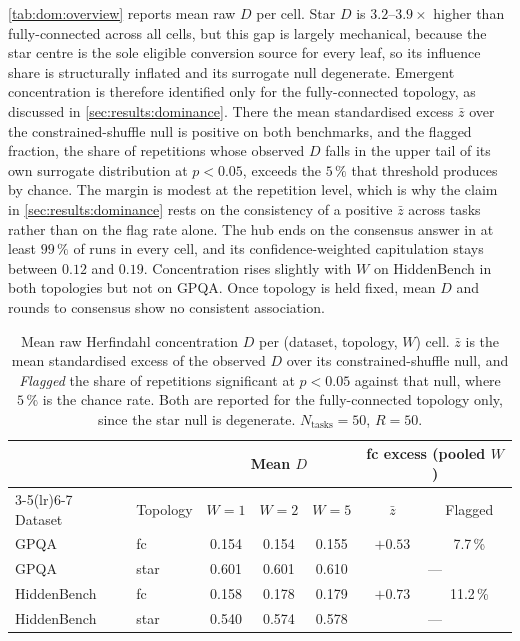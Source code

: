 \autoref{tab:dom:overview} reports mean raw $D$ per cell. Star $D$ is
$3.2$--$3.9\times$ higher than fully-connected across all cells, but this gap is
largely mechanical, because the star centre is the sole eligible conversion source for
every leaf, so its influence share is structurally inflated and its surrogate null
degenerate. Emergent concentration is therefore identified only for the
fully-connected topology, as discussed in \autoref{sec:results:dominance}. There
the mean standardised excess $\bar z$ over the constrained-shuffle null is positive
on both benchmarks, and the flagged fraction, the share of repetitions whose
observed $D$ falls in the upper tail of its own surrogate distribution at
$p < 0.05$, exceeds the $5\,\%$ that threshold produces by chance. The margin is
modest at the repetition level, which is why the claim in
\autoref{sec:results:dominance} rests on the consistency of a positive $\bar z$
across tasks rather than on the flag rate alone. The hub ends on the consensus
answer in at least $99\,\%$ of runs in every cell, and its confidence-weighted
capitulation stays between $0.12$ and $0.19$. Concentration rises slightly with $W$
on HiddenBench in both topologies but not on GPQA. Once topology is held fixed,
mean $D$ and rounds to consensus show no consistent association.

\begin{table}[H]
\centering
\small
\begin{tabular}{llccccc}
\toprule
 & & \multicolumn{3}{c}{Mean $D$} & \multicolumn{2}{c}{fc excess (pooled $W$)} \\
\cmidrule(lr){3-5}\cmidrule(lr){6-7}
Dataset & Topology & $W=1$ & $W=2$ & $W=5$ & $\bar{z}$ & Flagged \\
\midrule
GPQA        & fc   & 0.154 & 0.154 & 0.155 & $+0.53$ & 7.7\,\% \\
GPQA        & star & 0.601 & 0.601 & 0.610 & \multicolumn{2}{c}{---} \\
HiddenBench & fc   & 0.158 & 0.178 & 0.179 & $+0.73$ & 11.2\,\% \\
HiddenBench & star & 0.540 & 0.574 & 0.578 & \multicolumn{2}{c}{---} \\
\bottomrule
\end{tabular}
\caption[Mean dominance by configuration]{Mean raw Herfindahl concentration $D$
         per (dataset, topology, $W$) cell. $\bar z$ is the mean standardised
         excess of the observed $D$ over its constrained-shuffle null, and
         \emph{Flagged} the share of repetitions significant at $p < 0.05$ against
         that null, where $5\,\%$ is the chance rate. Both are reported for the
         fully-connected topology only, since the star null is degenerate.
         $N_{\mathrm{tasks}} = 50$, $R = 50$.}
\label{tab:dom:overview}
\end{table}

